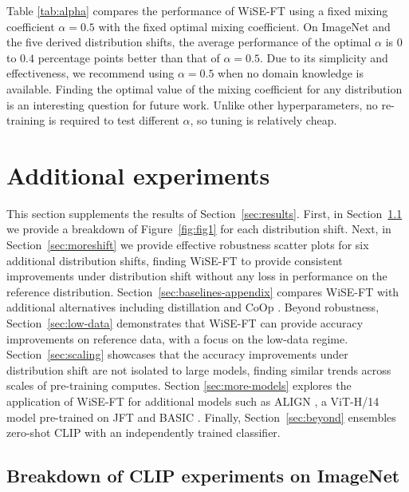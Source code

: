 Table \ref{tab:alpha} compares the performance of WiSE-FT using a fixed mixing coefficient $\alpha{=}0.5$ with the fixed optimal mixing coefficient. On ImageNet and the five derived distribution shifts, the average performance of the optimal $\alpha$ is $0$ to $0.4$ percentage points better than that of $\alpha{=}0.5$. 
Due to its simplicity and effectiveness, we recommend using $\alpha{=}0.5$ when no domain knowledge is available. Finding the optimal value of the mixing coefficient for any distribution is an interesting question for future work. Unlike other hyperparameters, no re-training is required to test different $\alpha$, so tuning is relatively cheap.


\section{Additional experiments}
\label{sec:appendix_additional_exps}




This section supplements the results of Section~\ref{sec:results}. First, in Section~\ref{sec:fig1breakdown} we provide a breakdown of Figure~\ref{fig:fig1} for each distribution shift.
Next, in Section~\ref{sec:moreshift} we provide effective robustness scatter plots for six additional distribution shifts, finding WiSE-FT to provide consistent improvements  under distribution shift without any loss in performance on the reference distribution.
Section~\ref{sec:baselines-appendix} compares WiSE-FT with additional alternatives including distillation and CoOp \cite{coop}.
Beyond robustness, Section~\ref{sec:low-data} demonstrates that WiSE-FT can provide accuracy improvements on reference data, with a focus on the low-data regime. Section~\ref{sec:scaling} showcases that the accuracy improvements under distribution shift are not isolated to large models, finding similar trends across scales of pre-training computes. Section \ref{sec:more-models} explores the application of WiSE-FT for additional models such as ALIGN \cite{jia2021scaling}, a ViT-H/14 model  pre-trained on JFT \cite{dosovitskiy2021an} and BASIC \cite{pham2021scaling}. Finally, Section~\ref{sec:beyond} ensembles zero-shot CLIP with an independently trained classifier.

\subsection{Breakdown of CLIP experiments on ImageNet}
\label{sec:fig1breakdown}

